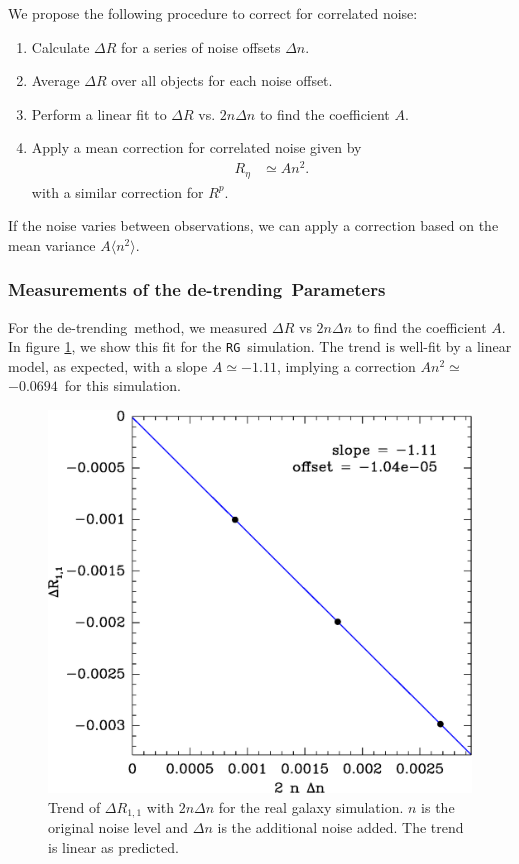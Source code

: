 \documentclass[usegraphicx,usenatbib]{mn2e}
\newcommand{\mcalRpsf}{$R^{p}$}
\newcommand{\mcalRnoise}{$R_\eta$}
\newcommand{\detrend}{de-trending}
\newcommand{\Aslope}{$-1.11$}
\newcommand{\Rcorr}{$-0.0694$}
\newcommand{\rgsim}{\texttt{RG}}
\begin{document}
We propose the following procedure to correct for correlated noise:
\begin{enumerate}
    \item Calculate $\Delta R$ for a series of noise offsets $\Delta n$.
    \item Average $\Delta R$ over all objects for each noise offset.
    \item Perform a linear fit to $\Delta R$ vs. $2 n \Delta n$ to find the 
        coefficient $A$.
    \item Apply a mean correction for correlated noise given by
        \begin{align}
            \mbox{\mcalRnoise} & \simeq A n^2.
        \end{align}
        with a similar correction for \mcalRpsf.
\end{enumerate}
If the noise varies between observations, we can apply a 
correction based on the mean variance $A
\langle n^2 \rangle$.

\subsubsection{Measurements of the \detrend\ Parameters}

For the \detrend\ method, we measured $\Delta R$ vs $2 n \Delta n$ to find the
coefficient $A$.  In figure \ref{fig:detrend}, we show this fit for the \rgsim\
simulation.  The trend is well-fit by a linear model, as expected, with a slope
$A \simeq $\Aslope, implying a correction $A n^2 \simeq$ \Rcorr\ for this
simulation.

\begin{figure}
    \includegraphics[scale=0.45]{mcal-v14s01-Rnoise-detrend-R11.eps}

    \caption{Trend of $\Delta R_{1,1}$ with $2 n \Delta n$ for the
        real galaxy simulation.   $n$ is the
    original noise level and $\Delta n$ is the additional noise added.  The
    trend is linear as predicted.}

\label{fig:detrend}
\end{figure}
\end{document}
